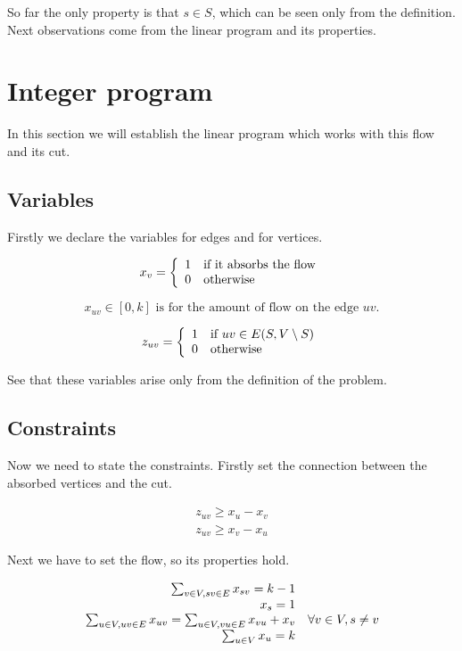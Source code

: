 \documentclass{article}
\theoremstyle{plain}
\theoremstyle{plain}
\theoremstyle{remark}
\begin{document}
	So far the only property is that $s \in S$, which can be seen only from the definition. Next observations come from the linear program and its properties.
	
	
	\section{Integer program}
	
	In this section we will establish the linear program which works with this flow and its cut.
	
	\subsection{Variables}
	
	Firstly we declare the variables for edges and for vertices.
	
	$$
	x_v = \left\{\begin{array}{l l}
		1 & \text{if it absorbs the flow} \\
		0 & \text{otherwise}
	\end{array}
	\right.
	$$
	
	$$
	x_{uv} \in [0,k] \text{ is for the amount of flow on the edge } uv.
	$$
	
	$$
	z_{uv} = \left\{\begin{array}{l l}
		1 & \text{if } uv \in E(S, V \setminus S)\\
		0 & \text{otherwise}
	\end{array}
	\right.
	$$
	
	See that these variables arise only from the definition of the problem.
	
	\subsection{Constraints}
	
	Now we need to state the constraints. Firstly set the connection between the absorbed vertices and the cut.
	
	$$
	\begin{array}{c}
		z_{uv} \geq x_u - x_v \\
		z_{uv} \geq x_v - x_u
	\end{array}
	$$
	
	Next we have to set the flow, so its properties hold.
	
	$$
	\begin{array}{r l}
		\sum_{v \in V, sv \in E} x_{sv} = k-1 \\
		x_s = 1 \\
		\sum_{u \in V, uv \in E} x_{uv} = \sum_{u \in V, vu \in E} x_{vu} + x_v & \forall v \in V, s \neq v \\
		\sum_{u \in V} x_u = k
	\end{array}
	$$
	
\end{document}
